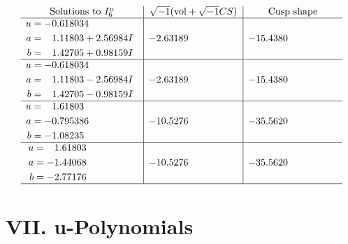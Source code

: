 \documentclass[1p]{elsarticle_modified}
\theoremstyle{definition}
\newcommand{\I}{\sqrt{-1}}
\begin{document}
$$\begin{array}{c|c|c}  
\text{Solutions to }I^u_{6}& \I (\text{vol} + \sqrt{-1}CS) & \text{Cusp shape}\\
 \hline 
\begin{aligned}
u &= -0.618034\phantom{ +0.000000I} \\
a &= \phantom{-}1.11803 + 2.56984 I \\
b &= \phantom{-}1.42705 + 0.98159 I\end{aligned}
 & -2.63189\phantom{ +0.000000I} & -15.4380\phantom{ +0.000000I} \\ \hline\begin{aligned}
u &= -0.618034\phantom{ +0.000000I} \\
a &= \phantom{-}1.11803 - 2.56984 I \\
b &= \phantom{-}1.42705 - 0.98159 I\end{aligned}
 & -2.63189\phantom{ +0.000000I} & -15.4380\phantom{ +0.000000I} \\ \hline\begin{aligned}
u &= \phantom{-}1.61803\phantom{ +0.000000I} \\
a &= -0.795386\phantom{ +0.000000I} \\
b &= -1.08235\phantom{ +0.000000I}\end{aligned}
 & -10.5276\phantom{ +0.000000I} & -35.5620\phantom{ +0.000000I} \\ \hline\begin{aligned}
u &= \phantom{-}1.61803\phantom{ +0.000000I} \\
a &= -1.44068\phantom{ +0.000000I} \\
b &= -2.77176\phantom{ +0.000000I}\end{aligned}
 & -10.5276\phantom{ +0.000000I} & -35.5620\phantom{ +0.000000I}\\
 \hline 
 \end{array}$$\newpage
\newpage\renewcommand{\arraystretch}{1}
\centering \section*{ VII. u-Polynomials}
\end{document}

